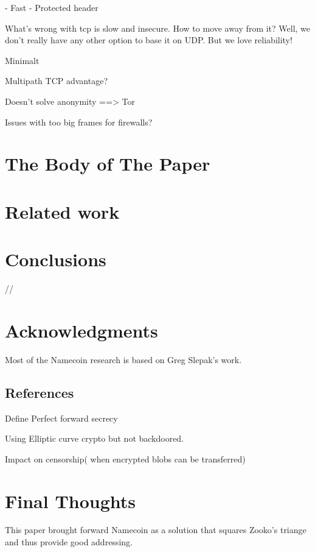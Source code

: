 \documentclass{vldb}
\begin{document}
- Fast
- Protected header

What's wrong with tcp is slow and insecure. How to move away from it? Well, we don't really have any other option to base it on UDP.
But we love reliability!

Minimalt  

Multipath TCP advantage?

Doesn't solve anonymity ==> Tor

Issues with too big frames for firewalls?
\section{The {\secit Body} of The Paper}

\section{Related work}

\section{Conclusions}
//\balance

\section{Acknowledgments}
Most of the Namecoin research is based on Greg Slepak's work.


\subsection{References}

\begin{appendix}
Define Perfect forward secrecy

Using Elliptic curve crypto but not backdoored.

Impact on censorship( when encrypted blobs can be transferred)
\section{Final Thoughts}
This paper brought forward Namecoin as a solution that squares Zooko's triange and thus provide good addressing.
\end{appendix}
\end{document}
